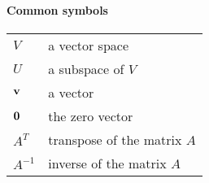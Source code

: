\paragraph{Common symbols}

\begin{tabular}{ll}
$V$ & {a vector space}\\
$U$ & {a subspace of $V$}\\
$\mathbf{v}$& {a vector}\\
$\mathbf{0}$&{the zero vector}\\
$A^T$& {transpose of the matrix $A$}\\
$A^{-1}$&{inverse of the matrix $A$}
\end{tabular}

